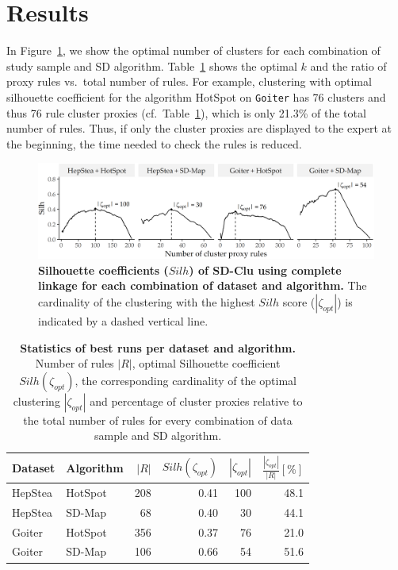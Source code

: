 \documentclass[
  oneside]{book}
\begin{document}
\hypertarget{sdclu-results}{%
\section{Results}\label{sdclu-results}}

In Figure~\ref{fig:04-silh-comparison}, we show the optimal number of clusters for each combination of study sample and SD algorithm.
Table~\ref{tab:04-silh} shows the optimal \(k\) and the ratio of proxy rules vs.~total number of rules.
For example, clustering with optimal silhouette coefficient for the algorithm HotSpot on \texttt{Goiter} has 76 clusters and thus 76 rule cluster proxies (cf.~Table~\ref{tab:04-silh}), which is only 21.3\% of the total number of rules.
Thus, if only the cluster proxies are displayed to the expert at the beginning, the time needed to check the rules is reduced.



\begin{figure}

{\centering \includegraphics[width=1\linewidth]{figures/04-silh-comparison} 

}

\caption{\textbf{Silhouette coefficients (\(Silh\)) of SD-Clu using complete linkage for each combination of dataset and algorithm.} The cardinality of the clustering with the highest \(Silh\) score (\(|\zeta_{opt}|\)) is indicated by a dashed vertical line.}\label{fig:04-silh-comparison}
\end{figure}



\begin{table}

\caption{\label{tab:04-silh}\textbf{Statistics of best runs per dataset and algorithm.} Number of rules \(|R|\), optimal Silhouette coefficient \(Silh(\zeta_{opt})\), the corresponding cardinality of the optimal clustering \(|\zeta_{opt}|\) and percentage of cluster proxies relative to the total number of rules for every combination of data sample and SD algorithm.}
\centering
\begin{tabular}[t]{llrrrr}
\toprule
Dataset & Algorithm & $|R|$ & $Silh(\zeta_{opt})$ & $|\zeta_{opt}|$ & $\frac{|\zeta_{opt}|}{|R|} [\%]$\\
\midrule
HepStea & HotSpot & 208 & 0.41 & 100 & 48.1\\
HepStea & SD-Map & 68 & 0.40 & 30 & 44.1\\
Goiter & HotSpot & 356 & 0.37 & 76 & 21.0\\
Goiter & SD-Map & 106 & 0.66 & 54 & 51.6\\
\bottomrule
\end{tabular}
\end{table}
\end{document}
